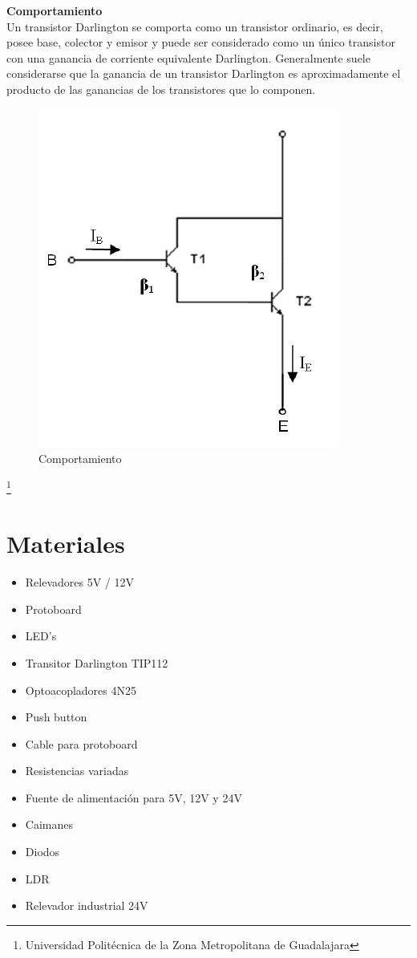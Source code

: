 \documentclass[10pt,a4paper]{article}
\begin{document}
\textbf{Comportamiento}\\
Un transistor Darlington se comporta como un transistor ordinario, es decir, posee base, colector y emisor y puede ser considerado como un único transistor con una ganancia de corriente equivalente Darlington. Generalmente suele considerarse que la ganancia de un transistor Darlington es aproximadamente el producto de las ganancias de los transistores que lo componen.\\
\begin{figure}[hbtp]
\centering
\includegraphics[scale=0.3]{2.PNG}
\caption{Comportamiento}
\end{figure}

\footnote{Universidad Politécnica de la Zona Metropolitana de Guadalajara}

\newpage
\section{Materiales}
\begin{itemize}
\item Relevadores 5V / 12V
\item Protoboard
\item LED's 
\item Transitor Darlington TIP112
\item Optoacopladores 4N25
\item Push button
\item Cable para protoboard
\item Resistencias variadas
\item Fuente de alimentación para 5V, 12V y 24V
\item Caimanes 
\item Diodos 
\item LDR
\item Relevador industrial 24V
\end{itemize}
\end{document}
